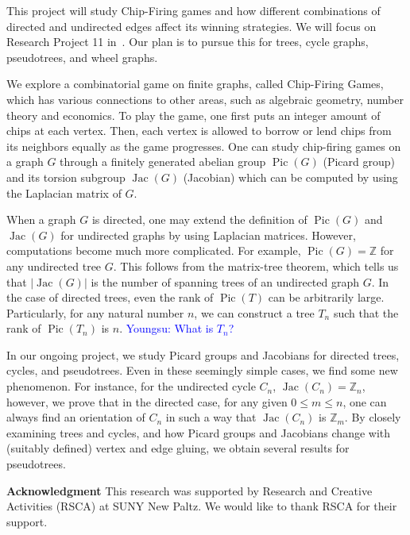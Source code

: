 \documentclass[11pt,reqno]{amsart}
\DeclareMathOperator{\Pic}{Pic}
\DeclareMathOperator{\Jac}{Jac}
\newcommand{\youngsu}[1]{{\textcolor{blue}{Youngsu: #1}}}
\theoremstyle{definition}
\theoremstyle{plain}
\begin{document}
	This project will study Chip-Firing games and how different combinations of directed and undirected edges affect its winning strategies. 
	We will focus on Research Project 11 in~\cite{glass2020chip}.
	Our plan is to pursue this for trees, cycle graphs, pseudotrees, and wheel graphs.


		We explore a combinatorial game on finite graphs, called Chip-Firing Games,
	which has various connections to other areas, such as algebraic geometry, number theory and economics.
	To play the game, one first puts an integer amount of chips at each vertex. 
	Then, each vertex is allowed to borrow or lend chips from its neighbors equally as the game progresses.
	One can study chip-firing games on a graph $G$ through a finitely generated abelian group
	$\Pic(G)$ (Picard group) and its torsion subgroup $\Jac (G)$ (Jacobian) which can
	be computed by using the Laplacian matrix of $G$.

	When a graph $G$ is directed, one may extend the definition of $\Pic(G)$ and $\Jac (G)$ for undirected
	graphs by using Laplacian matrices. 
	However, computations become much more complicated. 
	For example, $\Pic(G)=\mathbb{Z}$ for any undirected tree $G$. 
	This follows from the matrix-tree theorem, which tells us that $|\Jac (G)|$ is
	the number of spanning trees of an undirected graph $G$.
	In the case of directed trees, even the rank of $\Pic(T)$ can be arbitrarily large.
	Particularly, for any natural number $n$, we can construct a tree $T_n$ such that the rank of $\Pic(T_n)$ is $n$.  \youngsu{What is $T_n$?}

	In our ongoing project, we study Picard groups and Jacobians for directed trees, cycles, and pseudotrees.
	Even in these seemingly simple cases, we find some new phenomenon. For instance, for the undirected cycle $C_n$,
	$\Jac (C_n)=\mathbb{Z}_n$, however, we prove that in the directed case, for any given $0 \le m \leq n$, one can always find an orientation of $C_n$ in such a way that $\Jac (C_n)$ is $\mathbb{Z}_m$.
	By closely examining trees and cycles, and how Picard groups and Jacobians change with (suitably defined)
	vertex and edge gluing, we obtain several results for pseudotrees.

\bigskip


\textbf{Acknowledgment}\hspace{0.1cm} This research was supported by Research and Creative Activities (RSCA) at SUNY New Paltz. We would like to thank RSCA for their support.
\end{document}
